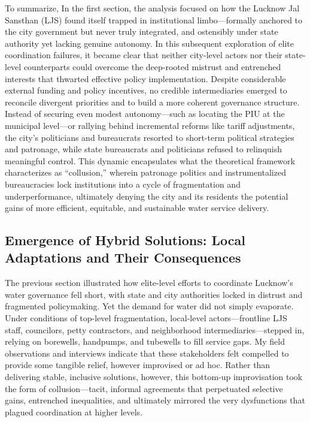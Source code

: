 To summarize, In the first section, the analysis focused on how the Lucknow Jal Sansthan (LJS) found itself trapped in institutional limbo—formally anchored to the city government but never truly integrated, and ostensibly under state authority yet lacking genuine autonomy. In this subsequent exploration of elite coordination failures, it became clear that neither city-level actors nor their state-level counterparts could overcome the deep-rooted mistrust and entrenched interests that thwarted effective policy implementation. Despite considerable external funding and policy incentives, no credible intermediaries emerged to reconcile divergent priorities and to build a more coherent governance structure. Instead of securing even modest autonomy—such as locating the PIU at the municipal level—or rallying behind incremental reforms like tariff adjustments, the city’s politicians and bureaucrats resorted to short-term political strategies and patronage, while state bureaucrats and politicians refused to relinquish meaningful control. This dynamic encapsulates what the theoretical framework characterizes as “collusion,” wherein patronage politics and instrumentalized bureaucracies lock institutions into a cycle of fragmentation and underperformance, ultimately denying the city and its residents the potential gains of more efficient, equitable, and sustainable water service delivery.


\subsection{ Emergence of Hybrid Solutions: Local Adaptations and Their Consequences}

The previous section illustrated how elite-level efforts to coordinate Lucknow’s water governance fell short, with state and city authorities locked in distrust and fragmented policymaking. Yet the demand for water did not simply evaporate. Under conditions of top-level fragmentation, local-level actors—frontline LJS staff, councilors, petty contractors, and neighborhood intermediaries—stepped in, relying on borewells, handpumps, and tubewells to fill service gaps. My field observations and interviews indicate that these stakeholders felt compelled to provide some tangible relief, however improvised or ad hoc. Rather than delivering stable, inclusive solutions, however, this bottom-up improvisation took the form of collusion—tacit, informal agreements that perpetuated selective gains, entrenched inequalities, and ultimately mirrored the very dysfunctions that plagued coordination at higher levels.



